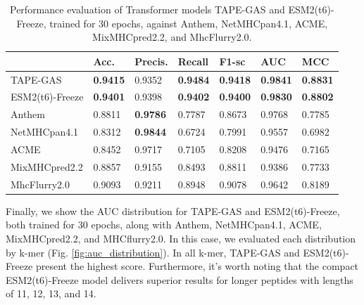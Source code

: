 \begin{table}[h]
	\centering
	\caption{Performance evaluation of Transformer models TAPE-GAS and ESM2(t6)-Freeze, trained for 30 epochs, against Anthem, NetMHCpan4.1, ACME, MixMHCpred2.2, and MhcFlurry2.0.}
	\label{tab:final_comparison}
	\scriptsize
	\begin{tabular}{lllllll} \hline
		& \textbf{Acc.} & \textbf{Precis.} & \textbf{Recall} & \textbf{F1-sc} & \textbf{AUC}    & \textbf{MCC}    \\ \hline
		TAPE-GAS        & \textbf{0.9415}   & 0.9352             & \textbf{0.9484} & \textbf{0.9418}   & \textbf{0.9841} & \textbf{0.8831} \\
		ESM2(t6)-Freeze & \textbf{0.9401}   & 0.9398             & \textbf{0.9402} & \textbf{0.9400}   & \textbf{0.9830} & \textbf{0.8802} \\
		
		Anthem          & 0.8811            & \textbf{0.9786}    & 0.7787          & 0.8673            & 0.9768          & 0.7785          \\
		NetMHCpan4.1    & 0.8312            & \textbf{0.9844}    & 0.6724          & 0.7991            & 0.9557          & 0.6982          \\
		
		ACME            & 0.8452            & 0.9717             & 0.7105          & 0.8208            & 0.9476          & 0.7165          \\
		MixMHCpred2.2   & 0.8857            & 0.9155             & 0.8493          & 0.8811            & 0.9386          & 0.7733          \\
		MhcFlurry2.0    & 0.9093            & 0.9211             & 0.8948          & 0.9078            & 0.9642          & 0.8189 \\ \hline        
	\end{tabular}
\end{table}


Finally, we show the AUC distribution for TAPE-GAS and ESM2(t6)-Freeze, both trained for 30 epochs, along with Anthem, NetMHCpan4.1, ACME, MixMHCpred2.2, and MHCflurry2.0. In this case, we evaluated each distribution by k-mer (Fig. \ref{fig:auc_distribution}). In all k-mer, TAPE-GAS and ESM2(t6)-Freeze present the highest score. Furthermore, it's worth noting that the compact ESM2(t6)-Freeze model delivers superior results for longer peptides with lengths of 11, 12, 13, and 14.


